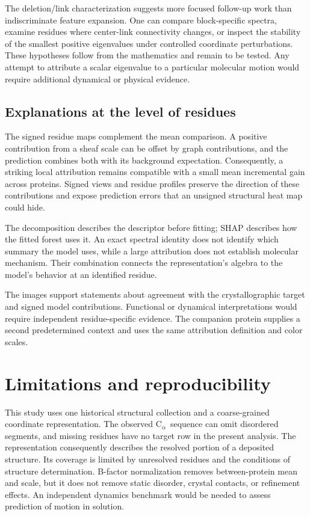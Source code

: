 \documentclass[11pt]{article}
\newcommand{\calpha}{C$_\alpha$}
\begin{document}
The deletion/link characterization suggests more focused follow-up work than indiscriminate feature expansion. One can compare block-specific spectra, examine residues where center-link connectivity changes, or inspect the stability of the smallest positive eigenvalues under controlled coordinate perturbations. These hypotheses follow from the mathematics and remain to be tested. Any attempt to attribute a scalar eigenvalue to a particular molecular motion would require additional dynamical or physical evidence.

\subsection{Explanations at the level of residues}
The signed residue maps complement the mean comparison. A positive contribution from a sheaf scale can be offset by graph contributions, and the prediction combines both with its background expectation. Consequently, a striking local attribution remains compatible with a small mean incremental gain across proteins. Signed views and residue profiles preserve the direction of these contributions and expose prediction errors that an unsigned structural heat map could hide.

The decomposition describes the descriptor before fitting; SHAP describes how the fitted forest uses it. An exact spectral identity does not identify which summary the model uses, while a large attribution does not establish molecular mechanism. Their combination connects the representation's algebra to the model's behavior at an identified residue.

The images support statements about agreement with the crystallographic target and signed model contributions. Functional or dynamical interpretations would require independent residue-specific evidence. The companion protein supplies a second predetermined context and uses the same attribution definition and color scales.

\section{Limitations and reproducibility}
This study uses one historical structural collection and a coarse-grained coordinate representation. The observed \calpha\ sequence can omit disordered segments, and missing residues have no target row in the present analysis. The representation consequently describes the resolved portion of a deposited structure. Its coverage is limited by unresolved residues and the conditions of structure determination. B-factor normalization removes between-protein mean and scale, but it does not remove static disorder, crystal contacts, or refinement effects. An independent dynamics benchmark would be needed to assess prediction of motion in solution.
\end{document}
